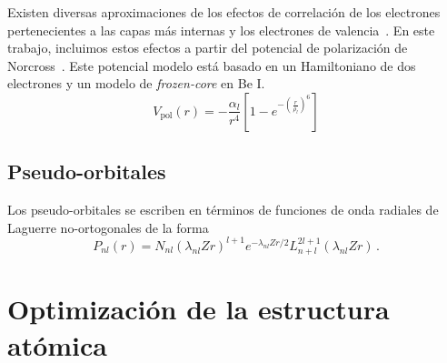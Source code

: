 Existen diversas aproximaciones de los efectos de correlación de los 
electrones pertenecientes a las capas más internas y los electrones de 
valencia~\cite{Seaton:72,Loughlin:73,Migdalek:78}. En este trabajo, 
incluimos estos efectos a partir del potencial de polarización de 
Norcross~\cite{Norcross:76}. Este potencial modelo está basado en un 
Hamiltoniano de dos electrones y un modelo de \textit{frozen-core} en 
Be I.
\begin{equation*}
 V_{\textrm{pol}}(r) = -\frac{\alpha_l}{r^4}\left[1-
e^{-\left(\tfrac{r}{\rho_l}\right)^6}\right]
\label{eq:Norcross-pot}
\end{equation*}

\subsection{Pseudo-orbitales}

Los pseudo-orbitales se escriben en términos de funciones de onda 
radiales de Laguerre no-ortogonales de la forma
\begin{equation}
P_{nl}(r) = N_{nl}(\lambda_{nl}Zr)^{l+1} e^{-\lambda_{nl}Zr/2} 
L_{n+l}^{2l+1}(\lambda_{nl}Zr)\,.
\label{eq:pseudo}
\end{equation}

\section{Optimización de la estructura atómica}

